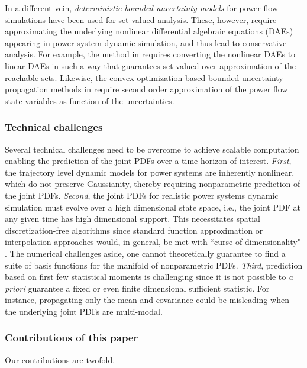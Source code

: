 \documentclass[10pt,twocolumn]{IEEEtran}
\newcommand{\red}{\color{red}}
\begin{document}
In a different vein, \emph{deterministic bounded uncertainty models} for power flow simulations have been used \cite{dimitrovski2004boundary,hiskens2006sensitivity,chen2012method,althoff2014formal} for set-valued analysis. These, however, require approximating the underlying nonlinear differential algebraic equations (DAEs) appearing in power system dynamic simulation, and thus lead to conservative analysis. For example, the method in \cite{althoff2014formal} requires converting the nonlinear DAEs to linear DAEs in such a way that guarantees set-valued over-approximation of the reachable sets. Likewise, the convex optimization-based bounded uncertainty propagation methods in \cite{choi2017propagating,choi2018propagating} require second order approximation of the power flow state variables as function of the uncertainties.

\subsubsection{Technical challenges}\label{subsubsec:technicalchallenges}
Several technical challenges need to be overcome to achieve scalable computation enabling the prediction of the joint PDFs over a time horizon of interest. \emph{First}, the trajectory level dynamic models for power systems are inherently nonlinear, which do not preserve Gaussianity, thereby requiring nonparametric prediction of the joint PDFs. \emph{Second}, the joint PDFs for realistic power systems dynamic simulation must evolve over a high dimensional state space, i.e., the joint PDF at any given time has high dimensional support. This necessitates spatial discretization-free algorithms since standard function approximation or interpolation approaches would, in general, be met with ``curse-of-dimensionality" \cite{bellman1957}. The numerical challenges aside, one cannot theoretically guarantee to find a suite of basis functions for the manifold of nonparametric PDFs. \emph{Third}, prediction based on first few statistical moments is challenging since it is not possible to \emph{a priori} guarantee a fixed or even finite dimensional sufficient statistic. For instance, propagating only the mean and covariance could be misleading when the underlying joint PDFs are multi-modal.

\subsubsection{Contributions of this paper}
Our contributions are twofold. {\red{TBD}} 
\end{document}

